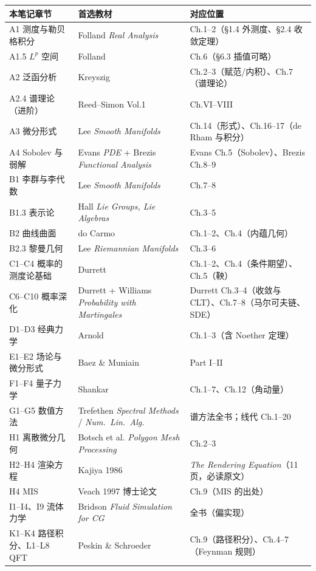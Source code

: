 \begin{center}
\begin{tabular}{L{3.9cm}L{5.2cm}L{5.5cm}}
\toprule
\textbf{本笔记章节} & \textbf{首选教材} & \textbf{对应位置} \\
\midrule
A1 测度与勒贝格积分 & Folland \emph{Real Analysis} & Ch.1--2（\S1.4 外测度、\S2.4 收敛定理） \\
A1.5 $L^p$ 空间 & Folland & Ch.6（\S6.3 插值可略） \\
A2 泛函分析 & Kreyszig & Ch.2--3（赋范/内积）、Ch.7（谱理论） \\
A2.4 谱理论（进阶） & Reed--Simon Vol.1 & Ch.VI--VIII \\
A3 微分形式 & Lee \emph{Smooth Manifolds} & Ch.14（形式）、Ch.16--17（de Rham 与积分） \\
A4 Sobolev 与弱解 & Evans \emph{PDE} + Brezis \emph{Functional Analysis} & Evans Ch.5（Sobolev）、Brezis Ch.8--9 \\
B1 李群与李代数 & Lee \emph{Smooth Manifolds} & Ch.7--8 \\
B1.3 表示论 & Hall \emph{Lie Groups, Lie Algebras} & Ch.3--5 \\
B2 曲线曲面 & do Carmo & Ch.1--2、Ch.4（内蕴几何） \\
B2.3 黎曼几何 & Lee \emph{Riemannian Manifolds} & Ch.3--6 \\
C1--C4 概率的测度论基础 & Durrett & Ch.1--2、Ch.4（条件期望）、Ch.5（鞅） \\
C6--C10 概率深化 & Durrett + Williams \emph{Probability with Martingales} & Durrett Ch.3--4（收敛与 CLT）、Ch.7--8（马尔可夫链、SDE） \\
D1--D3 经典力学 & Arnold & Ch.1--3（含 Noether 定理） \\
E1--E2 场论与微分形式 & Baez \& Muniain & Part I--II \\
F1--F4 量子力学 & Shankar & Ch.1--7、Ch.12（角动量） \\
G1--G5 数值方法 & Trefethen \emph{Spectral Methods} / \emph{Num.\ Lin.\ Alg.} & 谱方法全书；线代 Ch.1--20 \\
H1 离散微分几何 & Botsch et al. \emph{Polygon Mesh Processing} & Ch.2--3 \\
H2--H4 渲染方程 & Kajiya 1986 & \emph{The Rendering Equation}（11 页，必读原文） \\
H4 MIS & Veach 1997 博士论文 & Ch.9（MIS 的出处） \\
I1--I4、I9 流体力学 & Bridson \emph{Fluid Simulation for CG} & 全书（偏实现） \\
K1--K4 路径积分、L1--L8 QFT & Peskin \& Schroeder & Ch.9（路径积分）、Ch.4--7（Feynman 规则） \\

\end{tabular}
\end{center}
